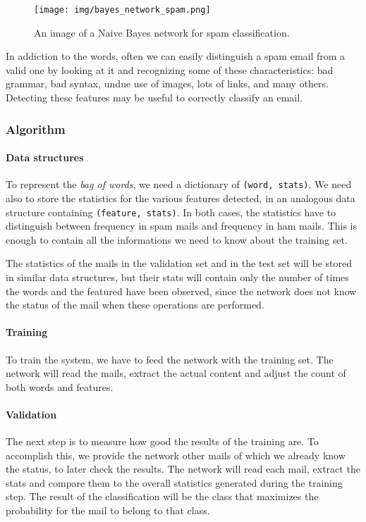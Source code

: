\begin{figure}[h]
  \begin{center}
    \texttt{[image: img/bayes\_network\_spam.png]}
    \caption{An image of a Naive Bayes network for spam classification.}
    \label{fig:nbs}
  \end{center}
\end{figure}

In addiction to the words, often we can easily distinguish a spam email from a valid one by looking at it and recognizing some of these characteristics: bad grammar, bad syntax, undue use of images, lots of links, and many others. Detecting these features may be useful to correctly classify an email.

\subsubsection{Algorithm}
\paragraph{Data structures}
To represent the \textit{bag of words}, we need a dictionary of \verb!(word, stats)!. We need also to store the statistics for the various features detected, in an analogous data structure containing \verb!(feature, stats)!. In both cases, the statistics have to distinguish between frequency in spam mails and frequency in ham mails. This is enough to contain all the informations we need to know about the training set.

The statistics of the mails in the validation set and in the test set will be stored in similar data structures, but their stats will contain only the number of times the words and the featured have been observed, since the network does not know the status of the mail when these operations are performed.

\paragraph{Training}
To train the system, we have to feed the network with the training set. The network will read the mails, extract the actual content and adjust the count of both words and features.

\paragraph{Validation}
The next step is to measure how good the results of the training are. To accomplish this, we provide the network other mails of which we already know the status, to later check the results. The network will read each mail, extract the stats and compare them to the overall statistics generated during the training step. The result of the classification will be the class that maximizes the probability for the mail to belong to that class.

